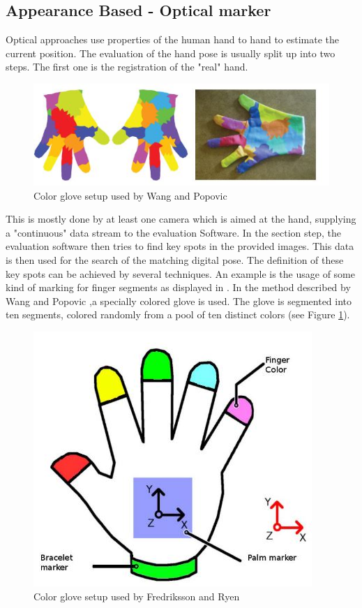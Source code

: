 \subsection{Appearance Based - Optical marker}
\label{Appearance Based Optical marker}
Optical approaches use properties of the human hand to hand to estimate the current position. The evaluation of the hand pose is usually split up into two steps. The first one is the registration of the "real" hand.\\
\begin{figure}
\includegraphics[scale=0.61]{images/wang_color_glove.JPG}
\caption{Color glove setup used by Wang and Popovic \cite{Wang.2009} }
\label{wang color glove}
\end{figure}
This is mostly done by at least one camera which is aimed at the hand, supplying a "continuous" data stream to the evaluation Software. In the section step, the evaluation software then tries to find key spots in the provided images. This data is then used for the search of the matching digital pose. The definition of these key spots can be achieved by several techniques.
An example is the usage of some kind of marking for finger segments as displayed in \cite{Duca.2007,Fredriksson.2008,Wang.2009}.
In the method described by Wang and Popovic \cite{Wang.2009},a specially colored glove is used. The glove is segmented into ten segments, colored randomly from a pool of ten distinct colors (see Figure \ref{wang color glove}).
\newpage
\begin{figure}
\includegraphics[scale=0.61]{images/fredrikkson_color_glove.JPG}
\caption{Color glove setup used by Fredriksson and Ryen \cite{Fredriksson.2008} }
\label{Fredriksson color glove}
\end{figure}

